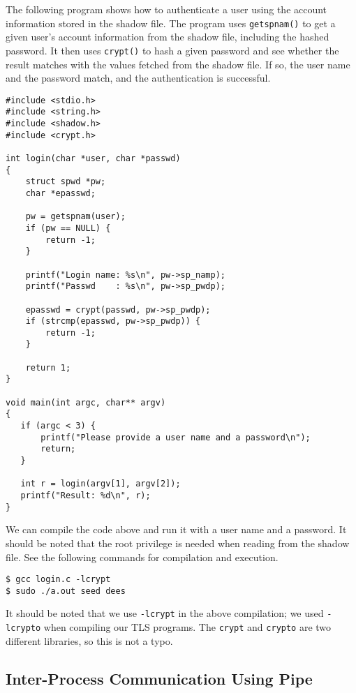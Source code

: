 The following program shows how to authenticate a user using 
the account information stored in the shadow file.
The program uses \texttt{getspnam()} to get 
a given user's account information from the shadow file, including the 
hashed password. It then uses \texttt{crypt()} to 
hash a given password and see whether the result matches with
the values fetched from the shadow file. If so, the user name and the password match, 
and the authentication is successful. 


\begin{lstlisting}
#include <stdio.h>
#include <string.h>
#include <shadow.h>
#include <crypt.h>

int login(char *user, char *passwd)
{
    struct spwd *pw;
    char *epasswd;

    pw = getspnam(user);
    if (pw == NULL) {
        return -1;
    }

    printf("Login name: %s\n", pw->sp_namp);
    printf("Passwd    : %s\n", pw->sp_pwdp);

    epasswd = crypt(passwd, pw->sp_pwdp);
    if (strcmp(epasswd, pw->sp_pwdp)) {
        return -1;
    }

    return 1;
}

void main(int argc, char** argv)
{
   if (argc < 3) {
       printf("Please provide a user name and a password\n");
       return;
   }

   int r = login(argv[1], argv[2]);
   printf("Result: %d\n", r);
}
\end{lstlisting}


We can compile the code above and run it with a user name and a password. 
It should be noted that the root privilege is needed when reading from the 
shadow file. See the following commands for compilation and execution.

\begin{lstlisting}
$ gcc login.c -lcrypt
$ sudo ./a.out seed dees
\end{lstlisting}
 
It should be noted that we use \texttt{-lcrypt} in the above compilation;
we used \texttt{-lcrypto} when compiling our TLS programs. The
\texttt{crypt} and \texttt{crypto} are two different libraries, so this is
not a typo.


\vspace{0.2in}
\subsection{Inter-Process Communication Using Pipe}
\label{vpn:subsec:pipe}

